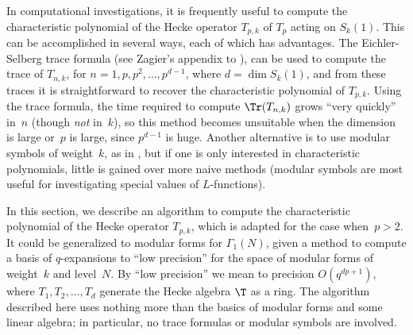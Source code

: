 \documentclass{report}
\begin{document}
In computational investigations, it is frequently useful to compute
the characteristic polynomial of the Hecke operator $T_{p,k}$ of $T_p$
acting on $S_k(1)$.  This can be accomplished in several ways, each of
which has advantages.  The Eichler-Selberg trace formula (see Zagier's
appendix to \cite[Ch.~III]{lang:modular}), can be used to compute the
trace of $T_{n,k}$, for $n=1, p, p^2, \ldots, p^{d-1}$, where $d=\dim
S_k(1)$, and from these traces it is straightforward to recover the
characteristic polynomial of $T_{p,k}$.  Using the trace formula, the
time required to compute $\Tr(T_{n,k})$ grows ``very quickly'' in~$n$
(though {\em not} in~$k$), so this method becomes unsuitable when the
dimension is large or~$p$ is large, since $p^{d-1}$ is huge.  Another
alternative is to use modular symbols of weight~$k$, as in
\cite{merel:1585}, but if one is only interested in characteristic
polynomials, little is gained over more naive methods (modular symbols
are most useful for investigating special values of $L$-functions).

In this section, we describe an algorithm to compute the
characteristic polynomial of the Hecke operator $T_{p,k}$, which
is adapted for the case when~$p>2$. It could be generalized to
modular forms for $\Gamma_1(N)$, given a method to compute a basis
of $q$-expansions to ``low precision'' for the space of modular
forms of weight~$k$ and level~$N$.  By ``low precision'' we mean
to precision $O(q^{dp+1})$, where $T_1,T_2,\ldots, T_d$ generate
the Hecke algebra $\T$ as a ring.  The algorithm described here
uses nothing more than the basics of modular forms and some linear
algebra; in particular, no trace formulas or modular symbols are
involved.
\end{document}
